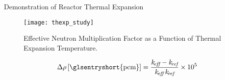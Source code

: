 \begin{frame}{Demonstration of Reactor Thermal Expansion}
  \begin{figure}
    \centering
    \texttt{[image: thexp\_study]}
    \caption{Effective Neutron Multiplication Factor as a Function of 
      Thermal Expansion Temperature.}
    \label{fig:thexp_study}
  \end{figure}
  \begin{equation}
    \label{eq:reactivity_formula}
    \Delta \rho \units{\glsentryshort{pcm}} = \frac{\keff - \kref}{\keff \, \kref} \times
      10^5
  \end{equation}
\end{frame}
